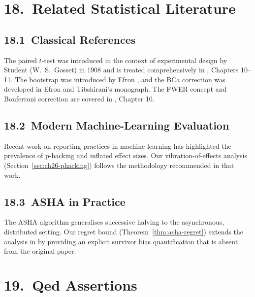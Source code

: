 \section{18.\ Related Statistical Literature}
\label{sec:ch26-related}

\subsection{18.1\ Classical References}

The paired \(t\)-test was introduced in the context of experimental design
by Student (W.\ S.\ Gosset) in 1908 and is treated comprehensively in
\cite{casella2002statistical}, Chapters 10--11.  The bootstrap was
introduced by Efron \cite{efron1994introduction}, and the BCa correction
was developed in Efron and Tibshirani's monograph.  The FWER concept and
Bonferroni correction are covered in \cite{wasserman2004statistics},
Chapter 10.

\subsection{18.2\ Modern Machine-Learning Evaluation}

Recent work on reporting practices in machine learning
\cite{ioannidis2008most} has highlighted the prevalence of p-hacking
and inflated effect sizes.  Our vibration-of-effects analysis
(Section~\ref{sec:ch26-phacking}) follows the methodology recommended
in that work.

\subsection{18.3\ ASHA in Practice}

The ASHA algorithm \cite{li2018hyperband} generalises successive halving
\cite{jamieson2016non} to the asynchronous, distributed setting.
Our regret bound (Theorem~\ref{thm:asha-regret}) extends the analysis
in \cite{li2018hyperband} by providing an explicit survivor bias
quantification that is absent from the original paper.

\section{19.\ Qed Assertions}\label{sec:ch26-qed-assertions}

